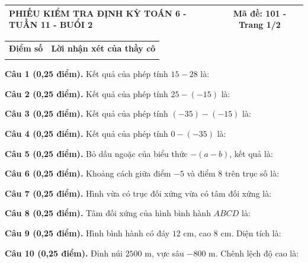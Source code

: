 \documentclass[12pt,a4paper]{article}
\begin{document}
\pagestyle{empty}
\noindent
\begin{tabularx}{\linewidth}{|X|c|}
\hline
\textbf{PHIẾU KIỂM TRA ĐỊNH KỲ TOÁN 6 - TUẦN 11 - BUỔI 2} & \textbf{Mã đề: 101 - Trang 1/2} \\
\hline
\end{tabularx}

\vspace{1.0mm}

\noindent
\begin{tabularx}{\linewidth}{|p{3.2cm}|X|}
\hline
\centering\textbf{Điểm số} & \centering\textbf{Lời nhận xét của thầy cô} \tabularnewline
\rule{0pt}{1.8cm} & \\
\hline
\end{tabularx}

\vspace{1.0mm}
\noindent\textbf{Câu 1 (0,25 điểm).} Kết quả của phép tính $15 - 28$ là: \par\vspace{0.25mm}
\noindent\textbf{Câu 2 (0,25 điểm).} Kết quả của phép tính $25 - (-15)$ là: \par\vspace{0.25mm}
\noindent\textbf{Câu 3 (0,25 điểm).} Kết quả của phép tính $(-35) - (-15)$ là: \par\vspace{0.25mm}
\noindent\textbf{Câu 4 (0,25 điểm).} Kết quả của phép tính $0 - (-35)$ là: \par\vspace{0.25mm}
\noindent\textbf{Câu 5 (0,25 điểm).} Bỏ dấu ngoặc của biểu thức $-(a - b)$, kết quả là: \par\vspace{0.25mm}
\noindent\textbf{Câu 6 (0,25 điểm).} Khoảng cách giữa điểm $-5$ và điểm $8$ trên trục số là: \par\vspace{0.25mm}
\noindent\textbf{Câu 7 (0,25 điểm).} Hình vừa có trục đối xứng vừa có tâm đối xứng là: \par\vspace{0.25mm}
\noindent\textbf{Câu 8 (0,25 điểm).} Tâm đối xứng của hình bình hành $ABCD$ là: \par\vspace{0.25mm}
\noindent\textbf{Câu 9 (0,25 điểm).} Hình bình hành có đáy $12\text{ cm}$, cao $8\text{ cm}$. Diện tích là: \par\vspace{0.25mm}
\noindent\textbf{Câu 10 (0,25 điểm).} Đỉnh núi $2500\text{ m}$, vực sâu $-800\text{ m}$. Chênh lệch độ cao là: \par\vspace{0.25mm}
\end{document}
